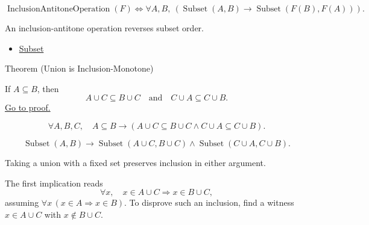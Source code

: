 \begin{remark*}
\[
  \operatorname{InclusionAntitoneOperation}(F)
  \iff
  \forall A,B,\ (\operatorname{Subset}(A,B)\to \operatorname{Subset}(F(B),F(A))).
\]
\end{remark*}

\begin{remark*}[Interpretation]
An inclusion-antitone operation reverses subset order.
\end{remark*}

\begin{dependencies}
\begin{itemize}
  \item \hyperref[def:subset]{Subset}
\end{itemize}
\end{dependencies}

\begin{theorembox}{Theorem (Union is Inclusion-Monotone)}
\begin{theorem}\label{thm:union-monotone-inclusion}
If $A\subseteq B$, then
\[
A\cup C\subseteq B\cup C
\quad\text{and}\quad
C\cup A\subseteq C\cup B.
\]
\hyperref[prf:union-monotone-inclusion]{Go to proof.}
\end{theorem}
\end{theorembox}


\begin{remark*}
\[
  \forall A,B,C,\quad
  A\subseteq B\to (A\cup C\subseteq B\cup C\wedge C\cup A\subseteq C\cup B).
\]
\end{remark*}

\begin{remark*}
\[
  \operatorname{Subset}(A,B)
  \to
  \operatorname{Subset}(A\cup C,B\cup C)
  \wedge
  \operatorname{Subset}(C\cup A,C\cup B).
\]
\end{remark*}

\begin{remark*}[Interpretation]
Taking a union with a fixed set preserves inclusion in either argument.
\end{remark*}

\begin{remark*}[Exposition]
The first implication reads
\[
\forall x,\quad x\in A\cup C \Rightarrow x\in B\cup C,
\]
assuming $\forall x\,(x\in A\Rightarrow x\in B)$. To disprove such an
inclusion, find a witness $x\in A\cup C$ with $x\notin B\cup C$.
\end{remark*}

